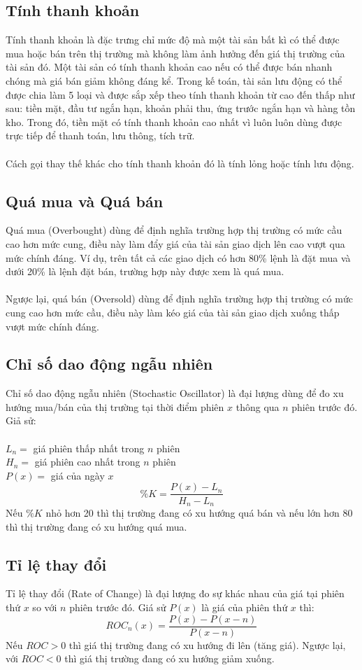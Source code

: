 \subsection{Tính thanh khoản}
Tính thanh khoản là đặc trưng chỉ mức độ mà một tài sản bất kì có thể được mua 
hoặc bán trên thị trường mà không làm ảnh hưởng đến giá thị trường của tài sản 
đó. Một tài sản có tính thanh khoản cao nếu có thể được bán nhanh chóng mà giá 
bán giảm không đáng kể. Trong kế toán, tài sản lưu động có thể được chia làm 5 
loại và được sắp xếp theo tính thanh khoản từ cao đến thấp như sau: tiền mặt, 
đầu tư ngắn hạn, khoản phải thu, ứng trước ngắn hạn và hàng tồn kho. Trong đó, 
tiền mặt có tính thanh khoản cao nhất vì luôn luôn dùng được trực tiếp để thanh 
toán, lưu thông, tích trữ.\\\\
Cách gọi thay thế khác cho tính thanh khoản đó là tính lỏng hoặc tính lưu động.
\subsection{Quá mua và Quá bán}
Quá mua (Overbought) dùng để định nghĩa trường hợp thị trường có mức cầu cao hơn 
mức cung, điều này làm đẩy giá của tài sản giao dịch lên cao vượt qua mức chính 
đáng. Ví dụ, trên tất cả các giao dịch có hơn 80\% lệnh là đặt mua và dưới 20\% 
là lệnh đặt bán, trường hợp này được xem là quá mua.\\\\
Ngược lại, quá bán (Oversold) dùng để định nghĩa trường hợp thị trường có mức 
cung cao hơn mức cầu, điều này làm kéo giá của tài sản giao dịch xuống thấp vượt 
mức chính đáng.
\subsection{Chỉ số dao động ngẫu nhiên}
Chỉ số dao động ngẫu nhiên (Stochastic Oscillator) là đại lượng dùng để đo xu 
hướng mua/bán của thị trường tại thời điểm phiên $x$ thông qua $n$ phiên trước 
đó. Giả sử:\\\\
\tab $L_{n} = $ giá phiên thấp nhất trong $n$ phiên\\
\tab $H_{n} = $ giá phiên cao nhất trong $n$ phiên\\
\tab $P(x) = $ giá của ngày $x$
\[\%K=\frac{P(x)-L_{n}}{H_{n}-L_{n}}\]
Nếu $ \%K $ nhỏ hơn 20 thì thị trường đang có xu hướng quá bán và nếu lớn hơn 
80 thì thị trường đang có xu hướng quá mua.
\subsection{Tỉ lệ thay đổi}
Tỉ lệ thay đổi (Rate of Change) là đại lượng đo sự khác nhau của giá tại phiên 
thứ $x$ so với $n$ phiên trước đó. Giá sử $P(x)$ là giá của phiên thứ $x$ thì:
\[ ROC_{n}(x)=\frac{P(x)-P(x-n)}{P(x-n)}\]
Nếu $ROC > 0$ thì giá thị trường đang có xu hướng đi lên (tăng giá).
Ngược lại, với $ROC < 0$ thì giá thị trường đang có xu hướng giảm xuống.
